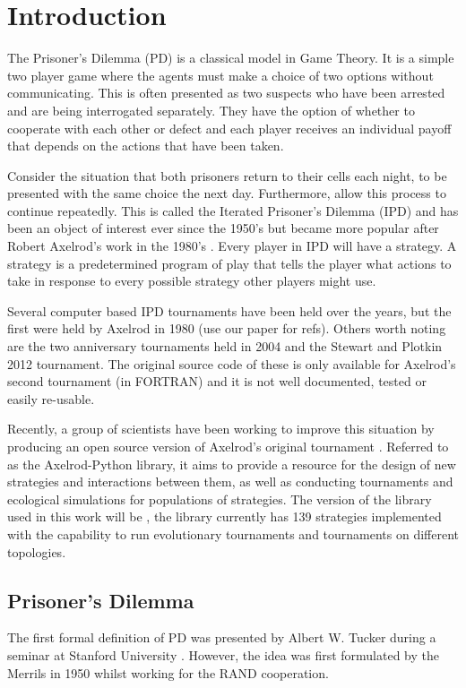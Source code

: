 
\chapter{Introduction}\label{cha:introduction}

The Prisoner's Dilemma (PD) is a classical model in Game Theory.
It is a simple two player game where the agents must make a choice of two options without communicating.
This is often presented as two suspects who have been arrested and are being interrogated separately.
They have the option of whether to cooperate with each other or defect and each player receives an individual payoff that depends on the actions that have been taken.

Consider the situation that both prisoners return to their cells each night, to be presented with the same choice the next day.
Furthermore, allow this process to continue repeatedly.
This is called the Iterated Prisoner's Dilemma (IPD) and has been an object of interest ever since the 1950's but became more popular after Robert Axelrod's work in the 1980's \cite{Axelrod2016}.
Every player in IPD will have a strategy.
A strategy is a predetermined program of play that tells the player what actions to take in response to every possible strategy other players might use.

Several computer based IPD tournaments have been held over the years, but the first were held by Axelrod in 1980 (use our paper for refs). %
Others worth noting are the two anniversary tournaments  held in 2004 and the Stewart and Plotkin 2012 tournament.
The original source code of these is only available for Axelrod's second tournament (in FORTRAN) and it is not well documented, tested or easily re-usable.

Recently, a group of scientists have been working to improve this situation by producing an open source version of Axelrod's original tournament \cite{Knight2016}.
Referred to as the Axelrod-Python library, it aims to provide a resource for the design of new strategies and interactions between them, as well as conducting tournaments and ecological simulations for populations of strategies.
The version of the library used in this work will be \cite{axelrodproject}, the library currently has 139 strategies implemented with the capability to run evolutionary tournaments and tournaments on different topologies.

\section{Prisoner's Dilemma}
The first formal definition of PD was presented by Albert W. Tucker during a seminar at Stanford University \cite{Gass2005}.
However, the idea was first formulated by the Merrils \cite{Flood1958} in 1950 whilst working for the RAND cooperation.

